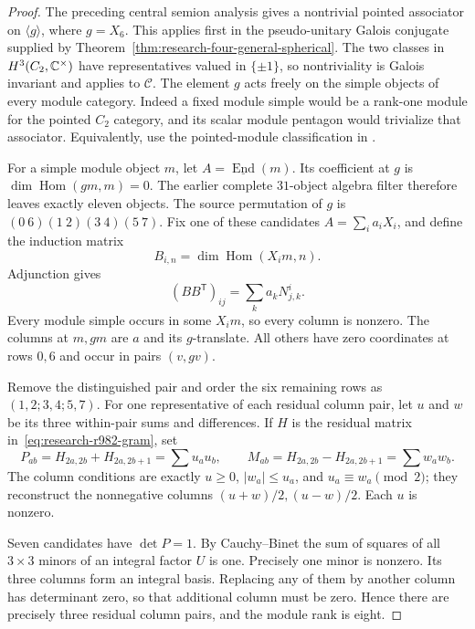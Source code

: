 \begin{proof}
The preceding central semion analysis gives a nontrivial pointed
associator on $\langle g\rangle$, where $g=X_6$.  This applies first
in the pseudo-unitary Galois conjugate supplied by
Theorem~\ref{thm:research-four-general-spherical}.  The two classes
in $H^3(C_2,\mathbb C^\times)$ have representatives valued in $\{\pm1\}$,
so nontriviality is Galois invariant and applies to $\mathcal C$.
The element $g$ acts freely on the simple objects of every module
category.  Indeed a fixed module simple would be a rank-one module
for the pointed $C_2$ category, and its scalar module pentagon would
trivialize that associator.  Equivalently, use the pointed-module
classification in \cite[Example~2.1]{OstrikDouble}.

For a simple module object $m$, let $A=\underline{\operatorname{End}}(m)$.
Its coefficient at $g$ is $\dim\operatorname{Hom}(gm,m)=0$.
The earlier complete $31$-object algebra filter therefore leaves
exactly eleven objects.  The source permutation of $g$ is
$(0\ 6)(1\ 2)(3\ 4)(5\ 7)$.
Fix one of these candidates $A=\sum_i a_iX_i$, and define the
induction matrix
\[
 B_{i,n}=\dim\operatorname{Hom}(X_i m,n).
\]
Adjunction gives
\begin{equation}\label{eq:research-r982-gram}
 (BB^{\mathsf T})_{ij}=\sum_k a_kN_{j,k}^{i}.
\end{equation}
Every module simple occurs in some $X_i m$, so every column is
nonzero.  The columns at $m,gm$ are $a$ and its $g$-translate.
All others have zero coordinates at rows $0,6$ and occur in pairs
$(v,gv)$.

Remove the distinguished pair and order the six remaining rows as
$(1,2;3,4;5,7)$.  For one representative of each residual column
pair, let $u$ and $w$ be its three within-pair sums and differences.
If $H$ is the residual matrix in~\eqref{eq:research-r982-gram}, set
\[
 P_{ab}=H_{2a,2b}+H_{2a,2b+1}=\sum u_a u_b,
 \qquad
 M_{ab}=H_{2a,2b}-H_{2a,2b+1}=\sum w_a w_b.
\]
The column conditions are exactly
$u\geq0$, $|w_a|\leq u_a$, and $u_a\equiv w_a\pmod2$;
they reconstruct the nonnegative columns $(u+w)/2,(u-w)/2$.
Each $u$ is nonzero.

Seven candidates have $\det P=1$.  By Cauchy--Binet the sum of
squares of all $3\times3$ minors of an integral factor $U$ is one.
Precisely one minor is nonzero.  Its three columns form an integral
basis.  Replacing any of them by another column has determinant zero,
so that additional column must be zero.  Hence there are precisely
three residual column pairs, and the module rank is eight.


\end{proof}
